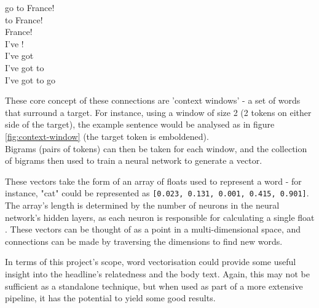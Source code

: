 \begin{minipage}{0.4\textwidth}
\begin{center}
 go to France!\\ \vspace{1mm}
 to France!\\ \vspace{1mm}
 France!\\ \vspace{1mm}
I've !\\ \vspace{1mm}
I've got \\ \vspace{1mm}
I've got to \\ \vspace{1mm}
I've got to go \\ 
\end{center}
\label{fig:context-window}

\end{minipage}
\begin{minipage}{0.5\textwidth}
These core concept of these connections are 'context windows' - a set of words that surround a target. For instance, using a window of size 2 (2 tokens on either side of the target), the example sentence would be analysed as in figure \ref{fig:context-window} (the target token is emboldened).\\
Bigrams (pairs of tokens) can then be taken for each window, and the collection of bigrams then used to train a neural network to generate a vector.
\end{minipage}

\vspace{2mm}

These vectors take the form of an array of floats used to represent a word - for instance, "cat" could be represented as \texttt{[0.023, 0.131, 0.001, 0.415, 0.901]}. The array's length is determined by the number of neurons in the neural network's hidden layers, as each neuron is responsible for calculating a single float \cite{bommana2019}. These vectors can be thought of as a point in a multi-dimensional space, and connections can be made by traversing the dimensions to find new words.

In terms of this project's scope, word vectorisation could provide some useful insight into the headline's relatedness and the body text. Again, this may not be sufficient as a standalone technique, but when used as part of a more extensive pipeline, it has the potential to yield some good results.

